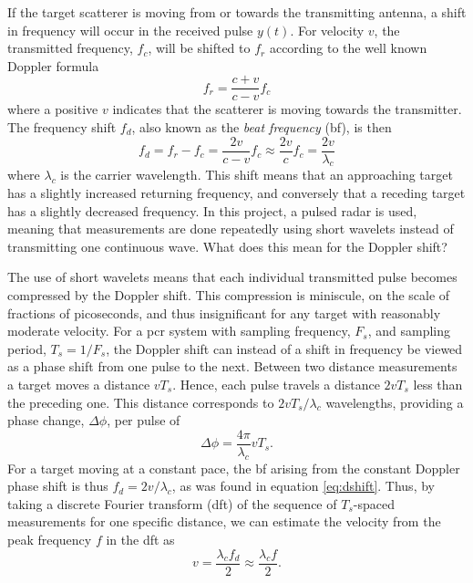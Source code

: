 If the target scatterer is moving from or towards the transmitting antenna, a shift in frequency will occur in the received pulse $y(t)$. For velocity $v$, the transmitted frequency, $f_c$, will be shifted to $f_r$ according to the well known Doppler formula \citep{ridenour_1947}
\begin{equation}
	f_r = \frac{c + v}{c - v}f_c
\end{equation}
where a positive $v$ indicates that the scatterer is moving towards the transmitter. The frequency shift $f_d$, also known as the \emph{beat frequency} (\gls{bf}), is then
\begin{equation}\label{eq:dshift}
	f_d 
	= f_r - f_c 
	= \frac{2v}{c-v}f_c \approx \frac{2v}{c}f_c 
	= \frac{2v}{\lambda_c}
\end{equation}
where $\lambda_c$ is the carrier wavelength. This shift means that an approaching target has a slightly increased returning frequency, and conversely that a receding target has a slightly decreased frequency. In this project, a pulsed radar is used, meaning that measurements are done repeatedly using short wavelets instead of transmitting one continuous wave. What does this mean for the Doppler shift?

The use of short wavelets means that each individual transmitted pulse becomes compressed by the Doppler shift. This compression is miniscule, on the scale of fractions of picoseconds, and thus insignificant for any target with reasonably moderate velocity. For a \gls{pcr} system with sampling frequency, $F_s$, and sampling period, $T_s = 1/F_s$, the Doppler shift can instead of a shift in frequency be viewed as a phase shift from one pulse to the next. Between two distance measurements a target moves a distance $vT_s$. Hence, each pulse travels a distance $2vT_s$ less than the preceding one. This distance corresponds to $2vT_s/\lambda_c$ wavelengths, providing a phase change, $\Delta \phi$, per pulse of
\begin{equation}
	\Delta \phi = \frac{4\pi}{\lambda_c}vT_s.
\end{equation}
For a target moving at a constant pace, the \gls{bf} arising from the constant Doppler phase shift is thus $f_d = 2v/\lambda_c$, as was found in equation \eqref{eq:dshift}. Thus, by taking a discrete Fourier transform (\gls{dft}) of the sequence of $T_s$-spaced measurements for one specific distance, we can estimate the velocity from the peak frequency $f$ in the \gls{dft} as 
\begin{equation}\label{eq:dopp}
	v = \frac{\lambda_c f_d}{2}
	\approx \frac{\lambda_c f}{2}.
\end{equation}


